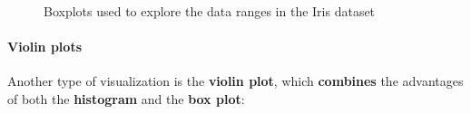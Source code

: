 \documentclass [oneside,10pt,a4paper,ngerman,BCOR10mm,headsepline,parindent,final]{scrartcl}
\begin{document}
    \begin{figure}
        \begin{center}\end{center}
        \caption{Boxplots used to explore the data ranges in the Iris dataset}
        \label{fig:boxplots_iris}
    \end{figure}
    
    \hypertarget{violin-plots}{%
\paragraph{Violin plots}\label{violin-plots}}

Another type of visualization is the \textbf{violin plot}, which
\textbf{combines} the advantages of both the \textbf{histogram} and the
\textbf{box plot}:
\end{document}
